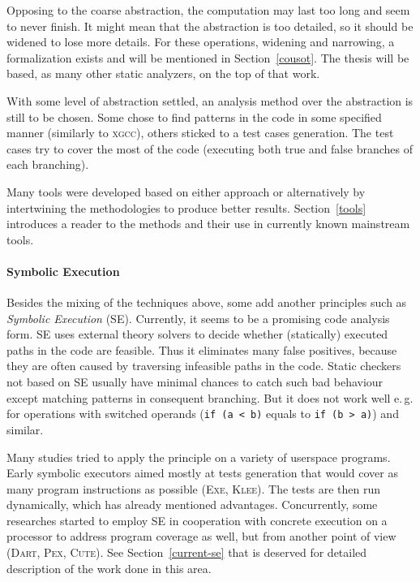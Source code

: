 \documentclass[11pt,a4paper]{article}
\begin{document}
Opposing to the coarse abstraction, the computation may last too long and seem
to never finish. It might mean that the abstraction is too detailed, so it
should be widened to lose more details. For these operations, widening and
narrowing, a formalization exists and will be mentioned in
Section~\ref{cousot}. The thesis will be based, as many other static
analyzers, on the top of that work.

With some level of abstraction settled, an analysis method over the
abstraction is still to be chosen. Some chose to find patterns in the code in
some specified manner (similarly to \textsc{xgcc}), others sticked to a test
cases generation. The test cases try to cover the most of the code (executing
both true and false branches of each branching).

Many tools were developed based on either approach or alternatively by
intertwining the methodologies to produce better results.
Section~\ref{tools} introduces a reader to the methods and their use in
currently known mainstream tools.

\paragraph{Symbolic Execution} Besides the mixing of the techniques above,
some add another principles such as \emph{Symbolic Execution} (SE). Currently,
it seems to be a promising code analysis form. SE uses external theory
solvers to decide whether (statically) executed paths in the code are
feasible. Thus it eliminates many false positives, because they are often
caused by traversing infeasible paths in the code. Static checkers not based
on SE usually have minimal chances to catch such bad behaviour except matching
patterns in consequent branching. But it does not work well e.\,g. for
operations with switched operands (\texttt{if (a < b)} equals to \texttt{if (b
> a)}) and similar.

Many studies tried to apply the principle on a variety of userspace programs.
Early symbolic executors aimed mostly at tests generation that would
cover as many program instructions as possible (\textsc{Exe}, \textsc{Klee}).
The tests are then run dynamically, which has already mentioned advantages.
Concurrently, some researches started to employ SE in cooperation with
concrete execution on a processor to address program coverage as well, but
from another point of view (\textsc{Dart}, \textsc{Pex}, \textsc{Cute}).  See
Section~\ref{current-se} that is deserved for detailed description of the work
done in this area.
\end{document}
